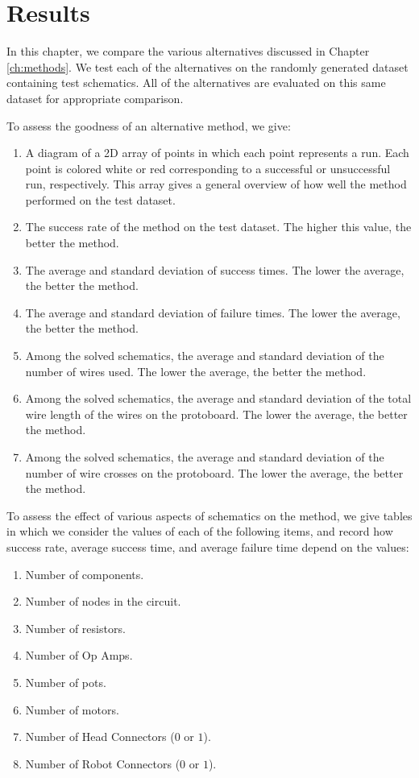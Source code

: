 
\chapter{Results}
\label{ch:results}

In this chapter, we compare the various alternatives discussed in Chapter
\ref{ch:methods}. We test each of the alternatives on the randomly generated
dataset
containing \q test schematics. All of the alternatives are evaluated on this
same dataset for appropriate comparison.

To assess the goodness of an alternative method, we give:
\begin{enumerate}
\item A diagram of a 2D array of points in which each point represents a run.
Each point is colored white or red corresponding to a successful or unsuccessful
run, respectively. This array gives a general overview of how well the method
performed on the test dataset.
\item The success rate of the method on the test dataset. The higher this value,
the better the method.
\item The average and standard deviation of success times. The lower the average,
the better the method.
\item The average and standard deviation of failure times. The lower the average,
the better the method.
\item Among the solved schematics, the average and standard deviation of the
number of wires used. The lower the average, the better the method.
\item Among the solved schematics, the average and standard deviation of the
total wire length of the wires on the protoboard. The lower the average, the
better the method.
\item Among the solved schematics, the average and standard deviation of the
number of wire crosses on the protoboard. The lower the average, the better the
method.
\end{enumerate}

To assess the effect of various aspects of schematics on the method, we give
tables in which we consider the values of each of the following items, and
record how success rate, average success time, and average failure time depend
on the values:
\begin{enumerate}
\item Number of components.
\item Number of nodes in the circuit.
\item Number of resistors.
\item Number of Op Amps.
\item Number of pots.
\item Number of motors.
\item Number of Head Connectors ($0$ or $1$).
\item Number of Robot Connectors ($0$ or $1$).
\end{enumerate}

